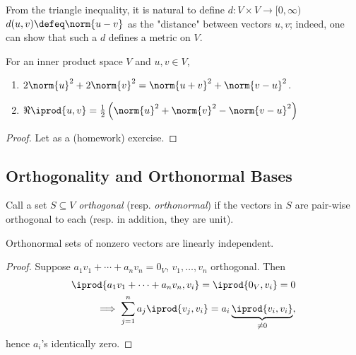 From the triangle inequality, it is natural to define $d :V \times V \to [0, \infty)$ $d(u, v) \defeq \norm{u - v}$ as the "distance" between vectors $u, v$; indeed, one can show that such a $d$ defines a metric on $V$.

\begin{proposition}
    For an inner product space $V$ and $u, v \in V$, \begin{enumerate}[label=(\alph*)]
        \item $2 \norm{u}^2 + 2 \norm{v}^2 = \norm{u + v}^2  + \norm{v - u}^2$.
        \item $\Re \iprod{u, v} = \frac{1}{2} \left(\norm{u}^2 + \norm{v}^2 - \norm{v - u}^2\right)$
    \end{enumerate}
\end{proposition}
\begin{proof}
    Let as a (homework) exercise.
\end{proof}

\subsection{Orthogonality and Orthonormal Bases}

\begin{definition}
    Call a set $S \subseteq V$ \emph{orthogonal} (resp. \emph{orthonormal}) if the vectors in $S$ are pair-wise orthogonal to each (resp. in addition, they are unit).
\end{definition}

\begin{proposition}\label{prop:orthonormallinindep}
    Orthonormal sets of nonzero vectors are linearly independent.
\end{proposition}
\begin{proof}
    Suppose $a_1 v_1 + \cdots + a_n v_n = 0_V$, $v_1, \dots, v_n$ orthogonal. Then \begin{align*}
        \iprod{a_1 v_1 + \cdots + a_n v_n, v_i} = \iprod{0_V, v_i} = 0\\
        \implies \sum_{j=1}^n a_j \iprod{v_j, v_i} = a_i \underbrace{\iprod{v_i, v_i}}_{\neq 0},
    \end{align*}
    hence $a_i$'s identically zero.
\end{proof}